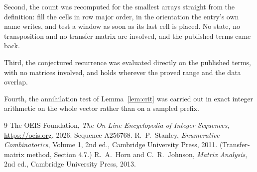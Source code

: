 \documentclass[11pt,a4paper]{article}
\theoremstyle{plain}
\theoremstyle{definition}
\begin{document}
Second, the count was recomputed for the smallest arrays straight from the definition: fill the
cells in row major order, in the orientation the entry's own name writes, and test a window as
soon as its last cell is placed. No state, no transposition and no transfer matrix are
involved, and the published terms came back.

Third, the conjectured recurrence was evaluated directly on the published terms, with no
matrices involved, and holds wherever the proved range and the data overlap.

Fourth, the annihilation test of Lemma~\ref{lem:crit} was carried out in exact integer
arithmetic on the whole vector rather than on a sampled prefix.

\begin{thebibliography}{9}
 The OEIS Foundation, \emph{The On-Line Encyclopedia of Integer
Sequences}, \url{https://oeis.org}, 2026. Sequence A256768.
 R.~P.~Stanley, \emph{Enumerative Combinatorics}, Volume 1, 2nd ed.,
Cambridge University Press, 2011. (Transfer-matrix method, Section 4.7.)
 R.~A.~Horn and C.~R.~Johnson, \emph{Matrix Analysis}, 2nd ed., Cambridge
University Press, 2013.
\end{thebibliography}
\end{document}
